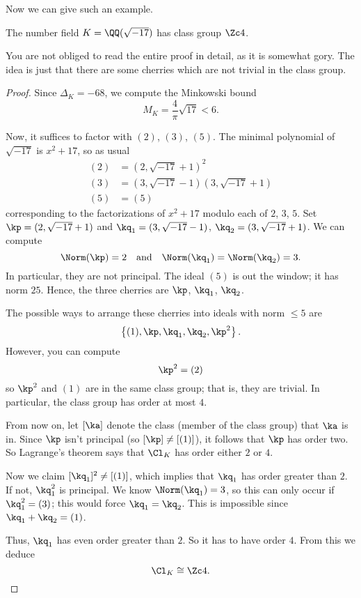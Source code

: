 Now we can give such an example.
\begin{proposition}
	The number field $K = \QQ(\sqrt{-17})$ has class group $\Zc 4$.
\end{proposition}
You are not obliged to read the entire proof in detail,
as it is somewhat gory.
The idea is just that there are some cherries which are not trivial in the class group.
\begin{proof}
Since $\Delta_K = -68$, we compute
the Minkowski bound
\[ M_K = \frac{4}{\pi} \sqrt{17} < 6. \]

Now, it suffices to factor with $(2)$, $(3)$, $(5)$.
The minimal polynomial of $\sqrt{-17}$ is $x^2+17$, so as usual
\begin{align*}
	(2) &= (2, \sqrt{-17}+1)^2 \\
	(3) &= (3, \sqrt{-17}-1)(3,\sqrt{-17}+1) \\
	(5) &= (5)
\end{align*}
corresponding to the factorizations of $x^2+17$ modulo each of $2$, $3$, $5$.
Set $\kp = (2, \sqrt{-17}+1)$ and $\kq_1 = (3, \sqrt{-17}-1)$, $\kq_2 = (3, \sqrt{-17}+1)$.
We can compute
\[ \Norm(\kp) = 2 \quad\text{and}\quad \Norm(\kq_1) = \Norm(\kq_2) = 3. \]
In particular, they are not principal.
The ideal $(5)$ is out the window; it has norm $25$.
Hence, the three cherries are $\kp$, $\kq_1$, $\kq_2$.

The possible ways to arrange these cherries into ideals with norm $\le 5$ are
\[ \left\{ (1), \kp, \kq_1, \kq_2, \kp^2 \right\}. \]
However, you can compute \[ \kp^2 = (2) \] so $\kp^2$ and $(1)$ are in the same class group;
that is, they are trivial.
In particular, the class group has order at most $4$.

From now on, let $[\ka]$ denote the class (member of the class group) that $\ka$ is in.
Since $\kp$ isn't principal (so $[\kp] \neq [(1)]$), it follows that $\kp$ has order two.
So Lagrange's theorem says that $\Cl_K$ has order either $2$ or $4$.

Now we claim $[\kq_1]^2 \neq [(1)]$, which implies that $\kq_1$ has order greater than $2$.
If not, $\kq_1^2$ is principal.
We know $\Norm(\kq_1) = 3$,
so this can only occur if $\kq_1^2 = (3)$;
this would force $\kq_1 = \kq_2$.
This is impossible since $\kq_1 + \kq_2 = (1)$.

Thus, $\kq_1$ has even order greater than $2$.
So it has to have order $4$.
From this we deduce \[ \Cl_K \cong \Zc 4. \qedhere \]
\end{proof}

